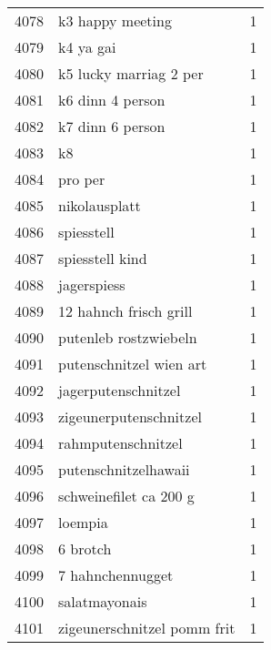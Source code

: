 \begin{tabular}{llr}
4078 &                                   k3 happy meeting &      1 \\
4079 &                                          k4 ya gai &      1 \\
4080 &                             k5 lucky marriag 2 per &      1 \\
4081 &                                   k6 dinn 4 person &      1 \\
4082 &                                   k7 dinn 6 person &      1 \\
4083 &                                                 k8 &      1 \\
4084 &                                            pro per &      1 \\
4085 &                                      nikolausplatt &      1 \\
4086 &                                         spiesstell &      1 \\
4087 &                                    spiesstell kind &      1 \\
4088 &                                        jagerspiess &      1 \\
4089 &                             12 hahnch frisch grill &      1 \\
4090 &                              putenleb rostzwiebeln &      1 \\
4091 &                            putenschnitzel wien art &      1 \\
4092 &                                jagerputenschnitzel &      1 \\
4093 &                             zigeunerputenschnitzel &      1 \\
4094 &                                 rahmputenschnitzel &      1 \\
4095 &                               putenschnitzelhawaii &      1 \\
4096 &                             schweinefilet ca 200 g &      1 \\
4097 &                                            loempia &      1 \\
4098 &                                           6 brotch &      1 \\
4099 &                                   7 hahnchennugget &      1 \\
4100 &                                      salatmayonais &      1 \\
4101 &                        zigeunerschnitzel pomm frit &      1 \\

\end{tabular}
